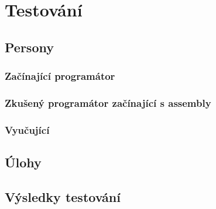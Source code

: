 \chapter{Testování}

\blind[1]

\section{Persony}

\blind[1]

\subsection{Začínající programátor}

\blind[3]

\subsection{Zkušený programátor začínající s assembly}

\blind[3]

\subsection{Vyučující}

\blind[1]

\section{Úlohy}

\blind[5]

\section{Výsledky testování}

\blind[3]